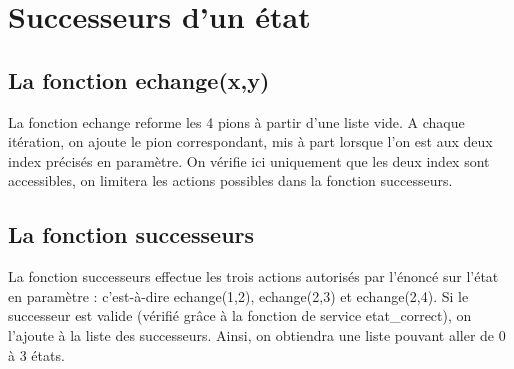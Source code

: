 \documentclass[a4paper,10pt]{report}
\begin{document}
\chapter{Successeurs d'un état}

  \section{La fonction echange(x,y)}
  La fonction echange reforme les 4 pions à partir d’une liste vide. A chaque itération, on ajoute le pion correspondant, mis à part lorsque l’on est aux deux index précisés en paramètre.  On vérifie ici uniquement que les deux index sont accessibles, on limitera les actions possibles dans la fonction successeurs.
  \section{La fonction successeurs}
  La fonction successeurs effectue les trois actions autorisés par l’énoncé sur l’état en paramètre : c’est-à-dire echange(1,2), echange(2,3) et echange(2,4). Si le successeur est valide (vérifié grâce à la fonction de service etat_correct), on l’ajoute à la liste des successeurs. Ainsi, on obtiendra une liste pouvant aller de 0 à 3 états.
\end{document}
